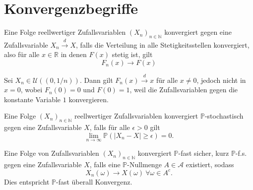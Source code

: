 \documentclass[prb,12pt, twocolumn]{revtex4-2}
\theoremstyle{definition}
\theoremstyle{definition}
\theoremstyle{definition}
\newcommand{\N}{\mathbb{N}}
\newcommand{\R}{\mathbb{R}}
\begin{document}
\section{Konvergenzbegriffe}
\begin{Note}
	Eine Folge reellwertiger Zufallsvariablen $(X_n)_{n\in \N}$ konvergiert gegen eine Zufallsvariable $X_n\xrightarrow{d}X$, falls die Verteilung in alle Stetigkeitsstellen konvergiert, also f\"{u}r alle $x\in \R$ in denen $F(x)$ stetig ist, gilt
	\[F_n(x) \to F(x)\]
\end{Note}
\begin{Note}[Beispiel]
	Sei $X_n\in \mathcal{U}((0,1/n))$. Dann gilt $F_n(x) \xrightarrow{d} x$ f\"{u}r alle $x\neq 0$, jedoch nicht in $x=0$, wobei $F_n(0) = 0$ und $F(0)=1$, weil die Zufallsvariablen gegen die konstante Variable $1$ konvergieren.
\end{Note}
\begin{Note}
	Eine Folge $(X_n)_{n\in \N}$ reellwertiger Zufallsvariablen konvergiert $\mathbb{P}$-stochastisch gegen eine Zufallsvariable $X$, falls f\"{u}r alle $\epsilon>0$ gilt
	\[
		\lim_{n \to \infty} \mathbb{P}(|X_n - X|\ge \epsilon) =0
	.\] 
\end{Note}
\begin{Note}
	Eine Folge von Zufallsvariablen $(X_n)_{n\in \N}$ konvergiert $\mathbb{P}$-fast sicher, kurz $\mathbb{P}$-f.s. gegen eine Zufallsvariable $X$, falls eine $\mathbb{P}$-Nullmenge $A\in \mathcal{A}$ existiert, sodass
	\[
	X_n(\omega)\to X(\omega)~\forall \omega\in A^c
	.\] 
	Dies entspricht $\mathbb{P}$-fast \"{u}berall Konvergenz.
\end{Note}
\end{document}

